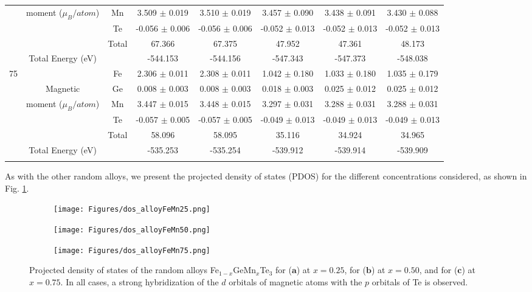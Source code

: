 \begin{table}[H]
{\begin{tabular}{cccccccc}
			& moment ($\mu_B /atom$) & Mn & 3.509 $\pm$ 0.019 & 3.510 $\pm$ 0.019 & 3.457 $\pm$ 0.090 & 3.438 $\pm$ 0.091 & 3.430 $\pm$ 0.088 \\ 
			& & Te & -0.056 $\pm$ 0.006 & -0.056 $\pm$ 0.006 & -0.052 $\pm$ 0.013 & -0.052 $\pm$ 0.013 & -0.052 $\pm$ 0.013 \\ 
			& & Total & 67.366 & 67.375 & 47.952 & 47.361 & 48.173 \\ 
			\midrule
			& Total Energy (eV) & & -544.153 & -544.156 & -547.343 & -547.373 & -548.038 \\ 		     
			\midrule
			\midrule
			\multirow{5}{*}{75} & & Fe & 2.306 $\pm$ 0.011 & 2.308 $\pm$ 0.011 & 1.042 $\pm$ 0.180 & 1.033 $\pm$ 0.180 & 1.035 $\pm$ 0.179 \\
			& Magnetic & Ge & 0.008 $\pm$ 0.003 & 0.008 $\pm$ 0.003 & 0.018 $\pm$ 0.003 & 0.025 $\pm$ 0.012 & 0.025 $\pm$ 0.012 \\ 
			& moment ($\mu_B /atom$) & Mn & 3.447 $\pm$ 0.015 & 3.448 $\pm$ 0.015 & 3.297 $\pm$ 0.031 & 3.288 $\pm$ 0.031 & 3.288 $\pm$ 0.031 \\ 
			& & Te & -0.057 $\pm$ 0.005 & -0.057 $\pm$ 0.005 & -0.049 $\pm$ 0.013 & -0.049 $\pm$ 0.013 & -0.049 $\pm$ 0.013 \\ 
			& & Total & 58.096 & 58.095 & 35.116 & 34.924 & 34.965 \\ 
			\midrule
			& Total Energy (eV) & & -535.253 & -535.254 & -539.912 & -539.914 & -539.909 \\ 		     
			\bottomrule
			\bottomrule
			\label{tab:4.15}
		\end{tabular}
	}
\end{table}

As with the other random alloys, we present the projected density of states (PDOS) for the different concentrations considered, as shown in Fig. \ref{fig:dosplotFeMnalloys}.

\begin{figure}[H]
	\centering
	\begin{subfigure}{.50\textwidth}
		\centering
		\texttt{[image: Figures/dos\_alloyFeMn25.png]}
	\end{subfigure}%
	\hfill %
	\begin{subfigure}{.50\textwidth}
		\centering
		\texttt{[image: Figures/dos\_alloyFeMn50.png]}
	\end{subfigure}
	\begin{subfigure}{.60\textwidth}
		\centering
		\texttt{[image: Figures/dos\_alloyFeMn75.png]}
	\end{subfigure}
	\caption{Projected density of states of the random alloys Fe$_{1-x}$GeMn$_{x}$Te$_{3}$ for ($\mathbf{a}$) at $x=0.25$, for ($\mathbf{b}$) at $x=0.50$, and for ($\mathbf{c}$) at $x=0.75$. In all cases, a strong hybridization of the $d$ orbitals of magnetic atoms with the $p$ orbitals of Te is observed.}
	\label{fig:dosplotFeMnalloys}
\end{figure}

